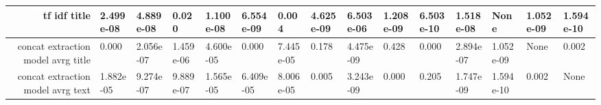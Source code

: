 \begin{tabular}{|r|l|l|l|l|l|l|l|l|l|l|l|l|l|l|}
  \hline
  tf idf title & 2.499e-08 & 4.889e-08 & 0.020 & 1.100e-08 & 6.554e-09 & 0.004 & 4.625e-09 & 6.503e-06 & 1.208e-09 & 6.503e-10 & 1.518e-08 & None & 1.052e-09 & 1.594e-10 \\ 
  \hline
  concat extraction model avrg title & 0.000 & 2.056e-07 & 1.459e-06 & 4.600e-05 & 0.000 & 7.445e-05 & 0.178 & 4.475e-09 & 0.428 & 0.000 & 2.894e-07 & 1.052e-09 & None & 0.002 \\ 
  \hline
  concat extraction model avrg text & 1.882e-05 & 9.274e-07 & 9.889e-07 & 1.565e-05 & 6.409e-05 & 8.006e-05 & 0.005 & 3.243e-09 & 0.000 & 0.205 & 1.747e-09 & 1.594e-10 & 0.002 & None \\ 
  \hline
\end{tabular}
